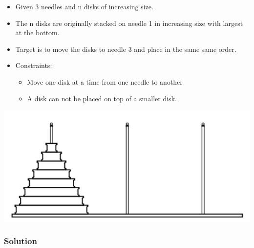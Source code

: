 \documentclass[12pt,oneside]{book}
\begin{document}
\begin{minipage}{0.6\linewidth}
	\begin{itemize}
		\item Given 3 needles and n disks of increasing size.
		\item The n disks are originally stacked on needle 1 in increasing size with largest at the bottom.
		\item Target is to move the disks to needle 3 and place in the same same order.
		\item Constraints:
		      \begin{itemize}
			      \item Move one disk at a time from one needle to another
			      \item A disk can not be placed on top of a smaller disk.
		      \end{itemize}
	\end{itemize}
\end{minipage}
\begin{minipage}{0.4\linewidth}
	\includegraphics[width=\linewidth]{../pic/python/11}
\end{minipage}
\subsubsection{Solution}
\end{document}
